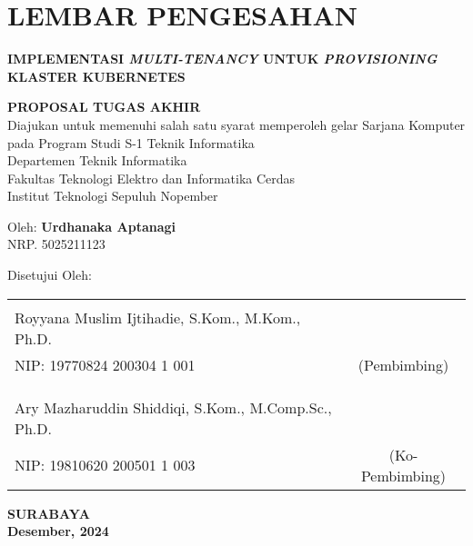 \chapter*{LEMBAR PENGESAHAN}
\thispagestyle{empty}

\begin{center}
  \textbf{IMPLEMENTASI \emph{MULTI-TENANCY} UNTUK \emph{PROVISIONING} KLASTER KUBERNETES}
\end{center}

\begingroup
\small

\begin{center}
  \textbf{PROPOSAL TUGAS AKHIR} \\
  Diajukan untuk memenuhi salah satu syarat memperoleh gelar
  Sarjana Komputer pada
  Program Studi S-1 Teknik Informatika \\
  Departemen Teknik Informatika \\
  Fakultas Teknologi Elektro dan Informatika Cerdas \\
  Institut Teknologi Sepuluh Nopember
\end{center}

\begin{center}
  Oleh: \textbf{Urdhanaka Aptanagi} \\
  NRP. 5025211123
\end{center}

\begin{center}
  Disetujui Oleh:
\end{center}

\vspace{10ex}

\begingroup
\setlength{\tabcolsep}{0pt}

\noindent
\begin{tabularx}{\textwidth}{X c}
        &                 \\
  Royyana Muslim Ijtihadie, S.Kom., M.Kom., Ph.D.     &                 \\
  NIP: 19770824 200304 1 001                          & (Pembimbing)    \\
                                                      &                 \\
                                                      &                 \\
                                                      &                 \\
  Ary Mazharuddin Shiddiqi, S.Kom., M.Comp.Sc., Ph.D. &                 \\
  NIP: 19810620 200501 1 003                          & (Ko-Pembimbing) \\
\end{tabularx}
\endgroup

\vspace{\fill}

\begin{center}
  \textbf{SURABAYA} \\
  \textbf{Desember, 2024}
\end{center}
\endgroup
